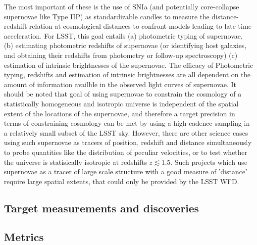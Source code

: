 The most important of these is the use of SNIa (and potentially core-collapse
supernovae like Type IIP) as standardizable candles to measure the 
distance-redshift relation at cosmological distances to confront models leading to late time
 acceleration. For LSST, this goal entails (a) photometric typing of supernovae,
 (b) estimating photometric redshifts of supernovae (or identifying host galaxies,
 and obtaining their redshifts from photometry or follow-up spectroscopy)
(c) estimation of intrinsic brightnesses of the supernovae. The efficacy of 
Photometric typing, redshifts and estimation of intrinsic brightnesses are all
dependent on the amount of information availble in the observed light curves of supernovae.
 It should be noted that goal of using supernovae to constrain the 
cosmology of a statistically homogeneous and isotropic universe is independent
of the spatial extent of the locations of the supernovae, and therefore a target
 precision in terms of constraining cosmology can be met by using a high cadence sampling
 in a relatively small subset of the LSST sky. However, there are other science cases
using such supernovae as tracers of position, redshift and distance simultaneously to probe
 quantities like the distribution of peculiar velocities, or to test whether the universe is
statisically isotropic at redshifts $z \lesssim 1.5$. Such projects which use supernovae as a tracer
of large scale structure with a good measure of 'distance' require large spatial extents, that could 
only be provided by the LSST WFD.



\subsection{Target measurements and discoveries}
\label{sec:keyword:targets}







\subsection{Metrics}
\label{sec:keyword:metrics}

